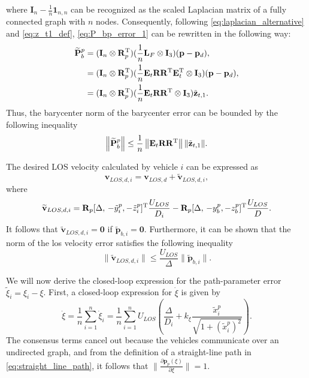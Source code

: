 where $\mathbf{I}_n - \frac{1}{n}\mathbf{1}_{n,n}$ can be recognized as the scaled Laplacian matrix of a fully connected graph with $n$ nodes. Consequently, following \eqref{eq:laplacian_alternative} and \eqref{eq:z_t1_def}, \eqref{eq:P_bp_error_1} can be rewritten in the following way:
\begin{equation}
    \begin{split}
        \widetilde{\mathbf{P}}_b^p &= (\mathbf{I}_n\otimes \mathbf{R}_p^{\rm T}) (\frac{1}{n}\mathbf{L}_F\otimes \mathbf{I}_3)(\mathbf{p}-\mathbf{p}_d),\\
        &= (\mathbf{I}_n\otimes \mathbf{R}_p^{\rm T}) (\frac{1}{n}\mathbf{E}_t\mathbf{R}\mathbf{R}^{\rm T}\mathbf{E}_t^{\rm T}\otimes \mathbf{I}_3)(\mathbf{p}-\mathbf{p}_d),\\
        &=
        (\mathbf{I}_n\otimes \mathbf{R}_p^{\rm T}) (\frac{1}{n}\mathbf{E}_t\mathbf{R}\mathbf{R}^{\rm T}\otimes \mathbf{I}_3)\tilde{\mathbf{z}}_{t,1}.
    \end{split}
\end{equation}
Thus, the barycenter norm of the barycenter error can be bounded by the following inequality
\begin{equation}
    \left\|\widetilde{\mathbf{P}}_b^p \right\| \leq \frac{1}{n}\left\|\mathbf{E}_t\mathbf{R}\mathbf{R}^{\rm T}\right\| \|\tilde{\mathbf{z}}_{t,1}\|.
\end{equation}


The desired LOS velocity calculated by vehicle $i$ can be expressed as 
\begin{equation}\label{eq:v_LOS_d_decomposition}
    \mathbf{v}_{LOS,d,i} = \mathbf{v}_{LOS,d} + \widetilde{\mathbf{v}}_{LOS,d,i},
\end{equation}
where
\begin{equation}
    \widetilde{\mathbf{v}}_{LOS,d,i} = \mathbf{R}_p [\Delta, \, -\tilde{y}_{i}^p, -\tilde{z}_{i}^p]^{\rm T} \frac{U_{LOS}}{D_i} - \mathbf{R}_p[\Delta, \, -y_{b}^p, -z_{b}^p]^{\rm T} \frac{U_{LOS}}{D}.
\end{equation}
It follows that $\widetilde{\mathbf{v}}_{LOS,d,i} = \mathbf{0}$ if $\widetilde{\mathbf{p}}_{b,i} = \mathbf{0}$. Furthermore, it can be shown that the norm of the \gls{los} velocity error satisfies the following inequality
\begin{equation}\label{eq:v_los_d_bound}
    \|\widetilde{\mathbf{v}}_{LOS,d,i}\| \leq \frac{U_{LOS}}{\Delta} \|\widetilde{\mathbf{p}}_{b,i} \|.
\end{equation}


We will now derive the closed-loop expression for the path-parameter error $\tilde{\xi}_i = \xi_i - \xi$. First, a closed-loop expression for $\dot{\xi}$ is given by
\begin{equation}\label{eq:dot_xi}
    \dot{\xi} = \frac{1}{n}\sum_{i=1}^n \dot{\xi}_i = \frac{1}{n}\sum_{i=1}^n U_{LOS}\left(\frac{\Delta}{D_i} + k_\xi \frac{\tilde{x}_{i}^p}{\sqrt{1 + (\tilde{x}_{i}^p)^2}}\right).
\end{equation}
The consensus terms cancel out because the vehicles communicate over an undirected graph, and from the definition of a straight-line path in \eqref{eq:straight_line_path}, it follows that $\| \frac{\partial \mathbf{p}_p(\xi)}{\partial \xi} \| = 1$.

